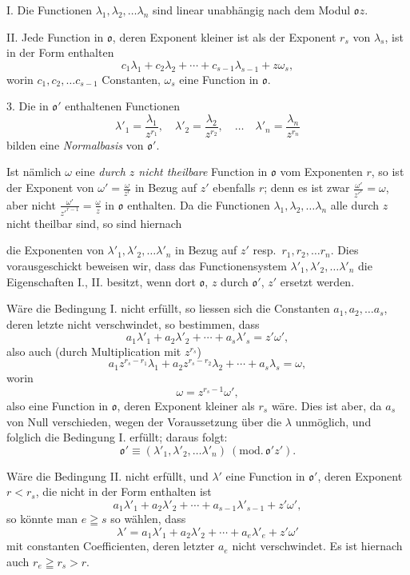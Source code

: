 \documentclass{article}
\begin{document}
I. Die Functionen $\lambda_{1}, \lambda_{2}, \ldots \lambda_{n}$ sind linear unabhängig nach dem Modul $\mathfrak{o}z$.

II. Jede Function in $\mathfrak{o}$, deren Exponent kleiner ist als der Exponent $r_{s}$ von $\lambda_{s}$, ist in der Form enthalten
\[ c_{1}\lambda_{1} + c_{2}\lambda_{2} + \cdots + c_{s-1}\lambda_{s-1} + z\omega_{s}, \]
worin $c_{1}, c_{2}, \ldots c_{s-1}$ Constanten, $\omega_{s}$ eine Function in $\mathfrak{o}$.

3. Die in $\mathfrak{o}'$ enthaltenen Functionen
\[ \lambda'_{1} = \frac{\lambda_{1}}{z^{r_{1}}}, \quad \lambda'_{2} = \frac{\lambda_{2}}{z^{r_{2}}}, \quad \ldots \quad \lambda'_{n} = \frac{\lambda_{n}}{z^{r_{n}}} \]
bilden eine \emph{Normalbasis} von $\mathfrak{o}'$.

Ist nämlich $\omega$ eine \emph{durch $z$ nicht theilbare} Function in $\mathfrak{o}$ vom Exponenten $r$, so ist der Exponent von $\omega' = \frac{\omega}{z^{r}}$ in Bezug auf $z'$ ebenfalls $r$; denn es ist zwar $\frac{\omega'}{z'^{r}} = \omega$, aber nicht $\frac{\omega'}{z'^{r-1}} = \frac{\omega}{z}$ in $\mathfrak{o}$ enthalten. Da die Functionen $\lambda_{1}, \lambda_{2}, \ldots \lambda_{n}$ alle durch $z$ nicht theilbar sind, so sind hiernach

die Exponenten von $\lambda'_{1}, \lambda'_{2}, \ldots \lambda'_{n}$ in Bezug auf $z'$ resp.\ $r_{1}, r_{2}, \ldots r_{n}$. Dies vorausgeschickt beweisen wir, dass das Functionensystem $\lambda'_{1}, \lambda'_{2}, \ldots \lambda'_{n}$ die Eigenschaften I., II. besitzt, wenn dort $\mathfrak{o}$, $z$ durch $\mathfrak{o}'$, $z'$ ersetzt werden.

Wäre die Bedingung I. nicht erfüllt, so liessen sich die Constanten $a_{1}, a_{2}, \ldots a_{s}$, deren letzte nicht verschwindet, so bestimmen, dass
\[ a_{1}\lambda'_{1} + a_{2}\lambda'_{2} + \cdots + a_{s}\lambda'_{s} = z'\omega', \]
also auch (durch Multiplication mit $z^{r_{s}}$)
\[ a_{1}z^{r_{s}-r_{1}}\lambda_{1} + a_{2}z^{r_{s}-r_{2}}\lambda_{2} + \cdots + a_{s}\lambda_{s} = \omega, \]
worin
\[ \omega = z^{r_{s}-1}\omega', \]
also eine Function in $\mathfrak{o}$, deren Exponent kleiner als $r_{s}$ wäre. Dies ist aber, da $a_{s}$ von Null verschieden, wegen der Voraussetzung über die $\lambda$ unmöglich, und folglich die Bedingung I. erfüllt; daraus folgt:
\[ \mathfrak{o}' \equiv (\lambda'_{1}, \lambda'_{2}, \ldots \lambda'_{n})\ (\text{mod.}\,\mathfrak{o}'z'). \]

Wäre die Bedingung II. nicht erfüllt, und $\lambda'$ eine Function in $\mathfrak{o}'$, deren Exponent $r < r_{s}$, die nicht in der Form enthalten ist
\[ a_{1}\lambda'_{1} + a_{2}\lambda'_{2} + \cdots + a_{s-1}\lambda'_{s-1} + z'\omega', \]
so könnte man $e \geqq s$ so wählen, dass
\[ \lambda' = a_{1}\lambda'_{1} + a_{2}\lambda'_{2} + \cdots + a_{e}\lambda'_{e} + z'\omega' \]
mit constanten Coefficienten, deren letzter $a_{e}$ nicht verschwindet. Es ist hiernach auch $r_{e} \geqq r_{s} > r$.
\end{document}
